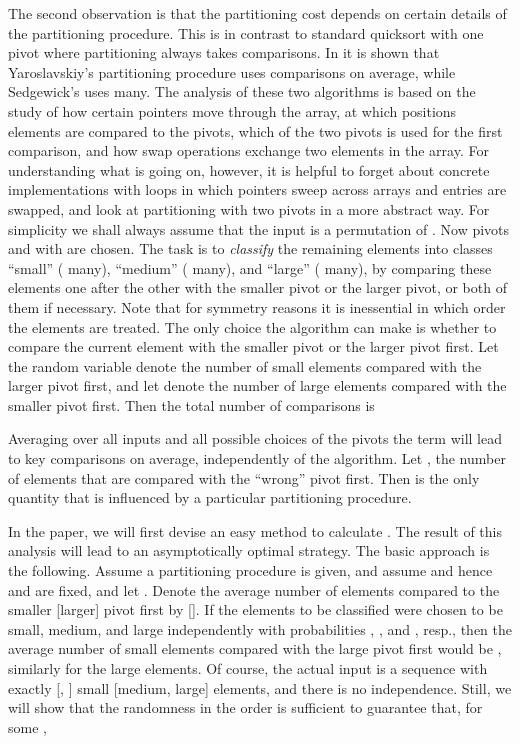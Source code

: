 \documentclass[prodmode,acmtalg]{acmsmall}
\begin{document}
The second observation is that the partitioning cost depends on certain details of the 
partitioning procedure. This is in contrast to standard quicksort with one pivot
where partitioning always takes  comparisons. In \cite{nebel12} it is shown
that Yaroslavskiy's partitioning procedure uses  comparisons on average,
while Sedgewick's uses  many. The analysis of these two
algorithms is based on the study of how certain pointers move through the array,
at which positions elements are compared to the pivots, which of the two pivots
is used for the first comparison, and how swap operations
exchange two elements in the array.
For understanding what is going on, however, it is helpful to forget about 
concrete implementations with loops in which pointers sweep across arrays and entries are swapped,
and look at partitioning with two pivots in a more abstract way.
For simplicity we shall always assume that the input is a permutation of .
Now pivots  and  with  are chosen. 
The task is to \emph{classify} the remaining  elements into classes 
``small'' ( many), ``medium'' ( many), and ``large'' ( many), 
by comparing these elements one after the other with the smaller pivot or
the larger pivot, or both of them if necessary. 
Note that for symmetry reasons it is inessential in which order the elements are treated.
The only choice the algorithm can make is
whether to compare the current element with the smaller pivot or the larger pivot first. 
Let the random variable  denote the number of small elements compared with the larger pivot first,
and let  denote the number of large elements compared with the smaller pivot first.
Then the total number of comparisons is 


Averaging over all inputs and all possible choices of the pivots 
the term  will lead to  key comparisons on average,
independently of the algorithm. 
Let ,
the number of elements that are compared with the ``wrong'' pivot first.
Then  is the only quantity that is influenced by a particular partitioning procedure.


In the paper, we will first devise an easy method to calculate . 
The result of this analysis will lead to an asymptotically optimal strategy.
The basic approach is the following. Assume a partitioning procedure is given, and 
assume  and hence  and  are fixed, 
and let .
Denote the average number of elements compared to the smaller [larger] pivot first by  [].
If the elements to be classified were chosen to be small, medium, and large independently
with probabilities , , and , resp., then the
average number of 
small elements compared with the large pivot first would be ,
similarly for the large elements. 
Of course, the actual input is a sequence with exactly  [, ] small [medium, large] elements, and there is no independence. 
Still, we will show that the randomness in the order is sufficient to guarantee that, for some ,
\end{document}
